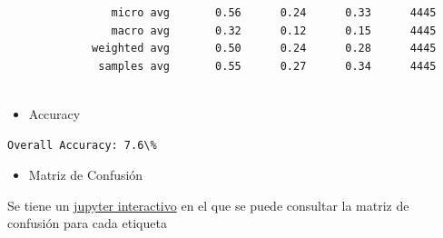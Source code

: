 \documentclass{article}
\begin{document}
\begin{verbatim}
                micro avg       0.56      0.24      0.33      4445
                macro avg       0.32      0.12      0.15      4445
             weighted avg       0.50      0.24      0.28      4445
              samples avg       0.55      0.27      0.34      4445


\end{verbatim}

\begin{itemize}
    	\item Accuracy
\end{itemize}
\begin{verbatim}
Overall Accuracy: 7.6\%
\end{verbatim}
		
\begin{itemize}
    	\item Matriz de Confusión
\end{itemize}		
Se tiene un {\href{https://github.com/ARJ-Code/codeforce-tag-predictor/blob/naive-bayes'model/src/naive\%20bayes\%20model/naive-bayes-model.ipynb}{jupyter interactivo}} en el que se puede consultar la matriz de confusión para cada etiqueta 
\end{document}
